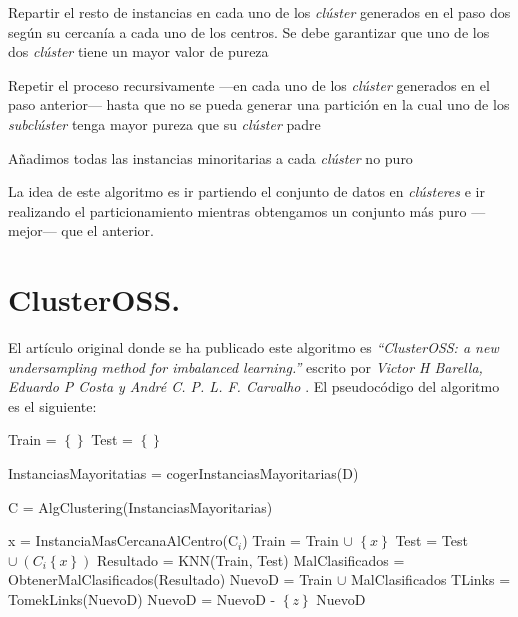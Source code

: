 \begin{codigo}
\begin{algorithmic}[1]
\State \parbox[t]{305pt}{Repartir el resto de instancias en cada uno de los \textit{clúster} generados en el paso dos según su cercanía a cada uno de los centros. Se debe garantizar que uno de los dos \textit{clúster} tiene un mayor valor de pureza\strut}
\State \parbox[t]{305pt}{Repetir el proceso recursivamente —en cada uno de los \textit{clúster} generados en el paso anterior— hasta que no se pueda generar una partición en la cual uno de los \textit{subclúster} tenga mayor pureza que su \textit{clúster} padre\strut}
\State \parbox[t]{305pt}{\Return Añadimos todas las instancias minoritarias a cada \textit{clúster} no puro\strut}
\EndFunction 
\end{algorithmic}
\end{codigo}

La idea de este algoritmo es ir partiendo el conjunto de datos en \textit{clústeres} e ir realizando el particionamiento mientras obtengamos un conjunto más puro —mejor— que el anterior.

\section{ClusterOSS.} \label{sec:alg_clusteross}
El artículo original donde se ha publicado este algoritmo es \textit{``ClusterOSS: a new undersampling method for imbalanced learning.''} escrito por \textit{Victor H Barella, Eduardo P Costa y André C. P. L. F. Carvalho} \cite{clusteross}. El pseudocódigo del algoritmo es el siguiente:

\begin{codigo}
\begin{algorithmic}[1]
\State \parbox[t]{305pt}{Train = $\left \{ \right \}$ Test = $\left \{ \right \}$\strut}
\State \parbox[t]{305pt}{InstanciasMayoritatias = cogerInstanciasMayoritarias(D)\strut}
\State \parbox[t]{305pt}{C = AlgClustering(InstanciasMayoritarias)\strut}
\State x = InstanciaMasCercanaAlCentro(C$_i$)
\State Train = Train $\cup$ $\left \{ x \right \}$
\State Test = Test $\cup\ (C_i\left \{ x \right \})$
\EndFor
\State Resultado = KNN(Train, Test)
\State MalClasificados = ObtenerMalClasificados(Resultado)
\State NuevoD = Train $\cup$ MalClasificados
\State TLinks = TomekLinks(NuevoD)
\State NuevoD = NuevoD - $\left \{ z \right \}$
\EndIf
\EndFor
\State \Return NuevoD
\EndFunction 
\end{algorithmic}
\end{codigo}

